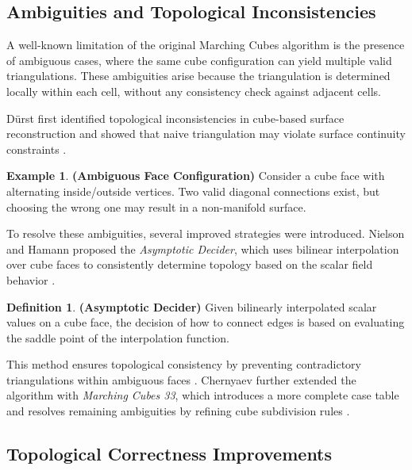 \documentclass[12pt, a4paper, oneside]{book}
\theoremstyle{plain}
\theoremstyle{definition}
\newtheorem{definition}[theorem]{Definition}
\newtheorem{example}[theorem]{Example}
\theoremstyle{remark}
\theoremstyle{definition}
\begin{document}
\subsection{Ambiguities and Topological Inconsistencies}

A well-known limitation of the original Marching Cubes algorithm is the presence of
ambiguous cases, where the same cube configuration can yield multiple valid
triangulations. These ambiguities arise because the triangulation is determined locally
within each cell, without any consistency check against adjacent cells.

Dürst first identified topological inconsistencies in cube-based surface reconstruction
and showed that naive triangulation may violate surface continuity constraints
\cite{durst1988marching}.

\begin{example}
    \textbf{(Ambiguous Face Configuration)}
Consider a cube face with alternating inside/outside vertices. Two valid diagonal
connections exist, but choosing the wrong one may result in a non-manifold surface.
\end{example}

\vspace{0.5em}

To resolve these ambiguities, several improved strategies were introduced. Nielson and
Hamann proposed the \emph{Asymptotic Decider}, which uses bilinear interpolation over
cube faces to consistently determine topology based on the scalar field behavior
\cite{nielson1991asymptotic}.

\begin{definition}
    \textbf{(Asymptotic Decider)}
Given bilinearly interpolated scalar values on a cube face, the decision of how to
connect edges is based on evaluating the saddle point of the interpolation function.
\end{definition}

This method ensures topological consistency by preventing contradictory triangulations
within ambiguous faces \cite{nielson1991asymptotic}. Chernyaev further extended the
algorithm with \emph{Marching Cubes 33}, which introduces a more complete case table and
resolves remaining ambiguities by refining cube subdivision rules
\cite{chernyaev1995marching}.

\vspace{0.5em}

\subsection{Topological Correctness Improvements}
\end{document}
